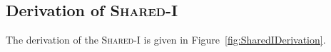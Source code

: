 \subsection{Derivation of \textsc{Shared-I}}

The derivation of the \textsc{Shared-I} is given in
Figure~\ref{fig:SharedIDerivation}. 






